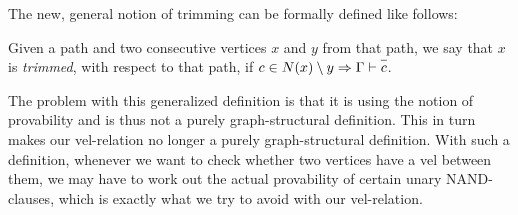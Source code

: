 The new, general notion of trimming can be formally defined like follows:
\begin{definition}
  Given a path and two consecutive vertices $x$ and $y$ from that path, we say that $x$ is \textit{trimmed}, with respect to that path, if $c \in N(x)\setminus y \Rightarrow \Gamma \vdash \ol{c}$.
  \label{def:new_trimming}
\end{definition}
The problem with this generalized definition is that it is using the notion of provability and is thus not a purely graph-structural definition.
This in turn makes our vel-relation no longer a purely graph-structural definition.
With such a definition, whenever we want to check whether two vertices have a vel between them, we may have to work out the actual provability of certain unary NAND-clauses, which is exactly what we try to avoid with our vel-relation.

